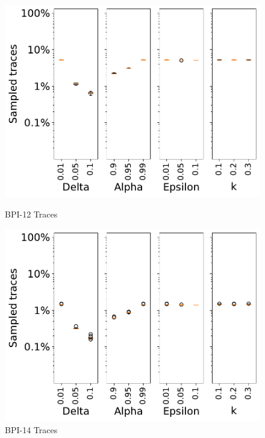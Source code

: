 \documentclass[landscape]{article}
\begin{document}
\vspace{-0.5cm}
\begin{figure}[!htb]
	\centering
	\begin{minipage}{0.2\textwidth}
		\includegraphics[width=1.0\textwidth]{../BPI_Challenge_2012/BPI_Challenge_2012_param_traces_Approx_k02.pdf}
		\caption{BPI-12 Traces}
	\end{minipage}
	\hfill
	\begin{minipage}{0.2\textwidth}
		\includegraphics[width=1.0\textwidth]{../Detail_Incident_Activity/Detail_Incident_Activity_param_traces_Approx_k02.pdf}
		\caption{BPI-14 Traces}
	\end{minipage}
	\hfill
	\begin{minipage}{0.2\textwidth}

\end{minipage}
\end{figure}
\end{document}
